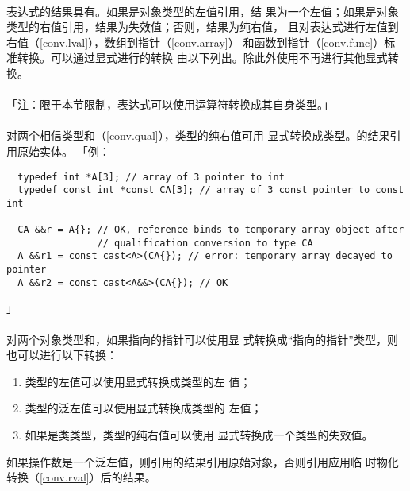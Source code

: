 \paragraph{}
表达式的结果具有。如果是对象类型的左值引用，结
果为一个左值；如果是对象类型的右值引用，结果为失效值；否则，结果为纯右值，
且对表达式进行左值到右值（\ref{conv.lval}），数组到指针（\ref{conv.array}）
和函数到指针（\ref{conv.func}）标准转换。可以通过显式进行的转换
由以下列出。除此外使用不再进行其他显式转换。

\paragraph{}
「注：限于本节限制，表达式可以使用运算符转换成其自身类型。」

\paragraph{}
对两个相信类型和（\ref{conv.qual}），类型的纯右值可用
显式转换成类型。的结果引用原始实体。
「例：
\begin{lstlisting}
  typedef int *A[3]; // array of 3 pointer to int
  typedef const int *const CA[3]; // array of 3 const pointer to const int

  CA &&r = A{}; // OK, reference binds to temporary array object after
                // qualification conversion to type CA
  A &&r1 = const_cast<A>(CA{}); // error: temporary array decayed to pointer
  A &&r2 = const_cast<A&&>(CA{}); // OK
\end{lstlisting}」

\paragraph{}
对两个对象类型和，如果指向的指针可以使用显
式转换成``指向的指针''类型，则也可以进行以下转换：
\begin{enumerate}
  \item{类型的左值可以使用显式转换成类型的左
    值；}
  \item{类型的泛左值可以使用显式转换成类型的
    左值；}
  \item{如果是类类型，类型的纯右值可以使用
    显式转换成一个类型的失效值。}
\end{enumerate}
如果操作数是一个泛左值，则引用的结果引用原始对象，否则引用应用临
时物化转换（\ref{conv.rval}）后的结果。

